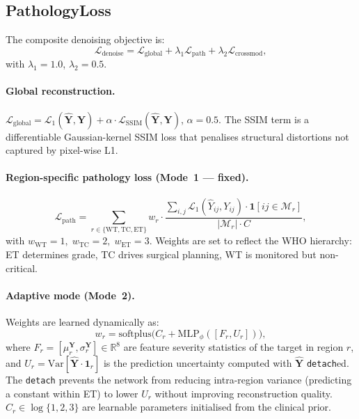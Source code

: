 \documentclass[runningheads]{llncs}
\newcommand{\ET}{\text{ET}}
\newcommand{\TC}{\text{TC}}
\newcommand{\WT}{\text{WT}}
\begin{document}
\subsection{PathologyLoss}
\label{subsec:pathloss}

The composite denoising objective is:
\begin{equation}
\mathcal{L}_\text{denoise} =
  \mathcal{L}_\text{global}
  + \lambda_1 \mathcal{L}_\text{path}
  + \lambda_2 \mathcal{L}_\text{crossmod},
\label{eq:denoise}
\end{equation}
with $\lambda_1{=}1.0$, $\lambda_2{=}0.5$.

\paragraph{Global reconstruction.}
$\mathcal{L}_\text{global} = \mathcal{L}_1(\hat{\bm{Y}}, \bm{Y}) +
  \alpha \cdot\mathcal{L}_\text{SSIM}(\hat{\bm{Y}}, \bm{Y})$,
$\alpha{=}0.5$.
The SSIM term is a differentiable Gaussian-kernel SSIM loss that
penalises structural distortions not captured by pixel-wise L1.

\paragraph{Region-specific pathology loss (Mode~1 — fixed).}
\begin{equation}
\mathcal{L}_\text{path}
  = \sum_{r \in \{\WT,\TC,\ET\}} w_r \cdot
    \frac{\sum_{i,j}
      \mathcal{L}_1(\hat{Y}_{ij},Y_{ij})\cdot\mathbf{1}[ij\!\in\!\mathcal{M}_r]}
         {|\mathcal{M}_r|\cdot C},
\label{eq:pathloss_fixed}
\end{equation}
with $w_\WT{=}1,\; w_\TC{=}2,\; w_\ET{=}3$.
Weights are set to reflect the WHO hierarchy: ET determines grade,
TC drives surgical planning, WT is monitored but non-critical.

\paragraph{Adaptive mode (Mode~2).}
Weights are learned dynamically as:
\begin{equation}
w_r = \mathrm{softplus}\!\bigl(C_r + \mathrm{MLP}_\phi([F_r, U_r])\bigr),
\label{eq:adaptive}
\end{equation}
where $F_r{=}[\mu_r^{\bm{Y}}, \sigma_r^{\bm{Y}}]\in\mathbb{R}^8$
are feature severity statistics of the target in region $r$, and
$U_r = \mathrm{Var}[\hat{\bm{Y}}\cdot\mathbf{1}_r]$
is the prediction uncertainty computed with
$\hat{\bm{Y}}$ \texttt{detach}ed.
The \texttt{detach} prevents the network from reducing intra-region
variance (predicting a constant within ET) to lower $U_r$ without
improving reconstruction quality.
$C_r \in \log\{1,2,3\}$ are learnable parameters initialised
from the clinical prior.
\end{document}
